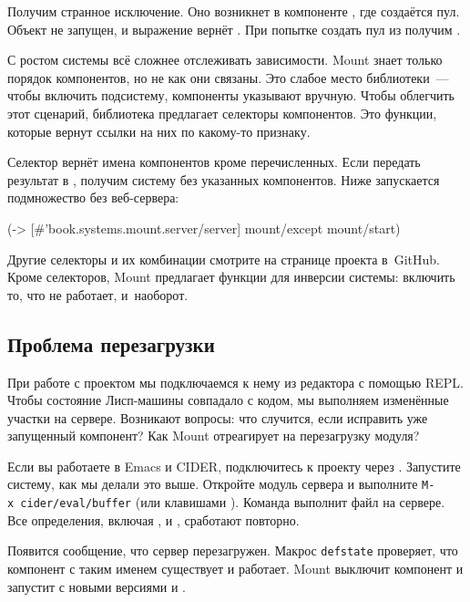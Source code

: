 Получим странное исключение. Оно возникнет в компоненте , где создаётся
пул. Объект  не запущен, и выражение  вернёт
. При попытке создать пул из  получим .

С ростом системы всё сложнее отслеживать зависимости. Mount знает только порядок
компонентов, но не как они связаны. Это слабое место библиотеки~--- чтобы
включить подсистему, компоненты указывают вручную. Чтобы облегчить этот
сценарий, библиотека предлагает селекторы компонентов. Это функции, которые
вернут ссылки на них по какому-то признаку.

Селектор  вернёт имена компонентов кроме перечисленных. Если
передать результат в , получим систему без указанных
компонентов. Ниже запускается подмножество без веб-сервера:

\begin{clojure}
(-> [#'book.systems.mount.server/server]
    mount/except
    mount/start)
\end{clojure}

Другие селекторы и их комбинации смотрите на странице проекта в~GitHub. Кроме
селекторов, Mount предлагает функции для инверсии системы: включить то, что не
работает, и~наоборот.

\subsection{Проблема перезагрузки}

При работе с проектом мы подключаемся к нему из редактора с помощью REPL. Чтобы
состояние Лисп-машины совпадало с кодом, мы выполняем изменённые участки на
сервере. Возникают вопросы: что случится, если исправить уже запущенный
компонент? Как Mount отреагирует на перезагрузку модуля?


Если вы работаете в Emacs и CIDER, подключитесь к проекту через
. Запустите систему, как мы делали это выше.
Откройте модуль сервера и выполните \texttt{M-x~cider\-/eval\-/buffer}
(или клавишами ). Команда выполнит файл на сервере.
Все определения, включая ,  и ,
сработают повторно.

Появится сообщение, что сервер перезагружен. Макрос \texttt{def\-state} проверяет,
что компонент с таким именем существует и работает. Mount выключит компонент и
запустит с новыми версиями  и .

